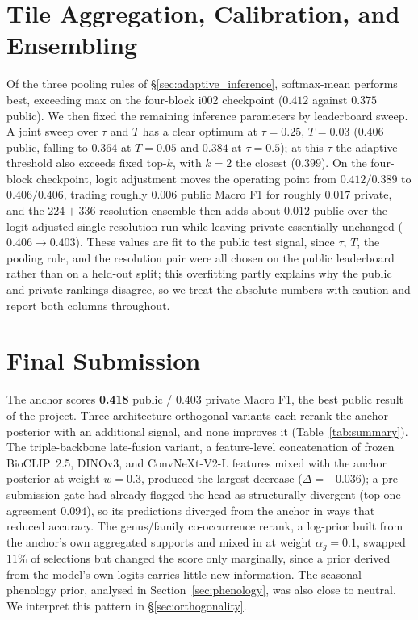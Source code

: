 \section{Tile Aggregation, Calibration, and Ensembling}
\label{sec:infer_ablations}

Of the three pooling rules of \S\ref{sec:adaptive_inference}, softmax-mean performs best, exceeding max on the four-block i002 checkpoint ($0.412$ against $0.375$ public). \label{sec:tile_aggregation} We then fixed the remaining inference parameters by leaderboard sweep. A joint sweep over $\tau$ and $T$ has a clear optimum at $\tau{=}0.25$, $T{=}0.03$ ($0.406$ public, falling to $0.364$ at $T{=}0.05$ and $0.384$ at $\tau{=}0.5$); at this $\tau$ the adaptive threshold also exceeds fixed top-$k$, with $k{=}2$ the closest ($0.399$). On the four-block checkpoint, logit adjustment moves the operating point from $0.412/0.389$ to $0.406/0.406$, trading roughly $0.006$ public Macro F1 for roughly $0.017$ private, and the $224{+}336$ resolution ensemble then adds about $0.012$ public over the logit-adjusted single-resolution run while leaving private essentially unchanged ($0.406\rightarrow0.403$). These values are fit to the public test signal, since $\tau$, $T$, the pooling rule, and the resolution pair were all chosen on the public leaderboard rather than on a held-out split; this overfitting partly explains why the public and private rankings disagree, so we treat the absolute numbers with caution and report both columns throughout.

\section{Final Submission}
\label{sec:final_results}

The anchor scores \textbf{0.418} public / $0.403$ private Macro F1, the best public result of the project. Three architecture-orthogonal variants each rerank the anchor posterior with an additional signal, and none improves it (Table~\ref{tab:summary}). The triple-backbone late-fusion variant, a feature-level concatenation of frozen BioCLIP~2.5, DINOv3, and ConvNeXt-V2-L features mixed with the anchor posterior at weight $w{=}0.3$, produced the largest decrease ($\Delta{=}-0.036$); a pre-submission gate had already flagged the head as structurally divergent (top-one agreement $0.094$), so its predictions diverged from the anchor in ways that reduced accuracy. The genus/family co-occurrence rerank, a log-prior built from the anchor's own aggregated supports and mixed in at weight $\alpha_g{=}0.1$, swapped $11\%$ of selections but changed the score only marginally, since a prior derived from the model's own logits carries little new information. The seasonal phenology prior, analysed in Section~\ref{sec:phenology}, was also close to neutral. We interpret this pattern in \S\ref{sec:orthogonality}.

